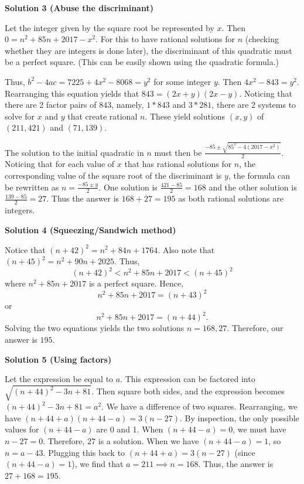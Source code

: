 \begin{enumerate}
\textbf{Solution 3 (Abuse the discriminant)}

Let the integer given by the square root be represented by $x$. Then $0 = n^2 + 85n + 2017 - x^2$. For this to have rational solutions for $n$ (checking whether they are integers is done later), the discriminant of this quadratic must be a perfect square. (This can be easily shown using the quadratic formula.)

 Thus, $b^2 - 4ac = 7225 + 4x^2 - 8068 = y^2$ for some integer $y$. Then $4x^2 - 843 = y^2$. Rearranging this equation yields that $843 = (2x+y)(2x-y)$. Noticing that there are 2 factor pairs of $843$, namely, $1*843$ and $3*281$, there are 2 systems to solve for $x$ and $y$ that create rational $n$. These yield solutions $(x,y)$ of $(211, 421)$ and $(71, 139)$.

 The solution to the initial quadratic in $n$ must then be $\frac{-85 \pm \sqrt{85^2 - 4(2017 - x^2)}}{2}$. Noticing that for each value of $x$ that has rational solutions for $n$, the corresponding value of the square root of the discriminant is $y$, the formula can be rewritten as $n = \frac{-85 \pm y}{2}$. One solution is $\frac{421 - 85}{2} = 168$ and the other solution is $\frac{139 - 85}{2} = 27$. Thus the answer is $168 + 27 = \boxed{195}$ as both rational solutions are integers.

 



\textbf{Solution 4 (Squeezing/Sandwich method)}

Notice that $(n+42)^2= n^2+84n+1764$. Also note that $(n+45)^2= n^2+90n+2025$. Thus, 
 \[(n+42)^2< n^2+85n+2017<(n+45)^2\] where $n^2+85n+2017$ is a perfect square. Hence,
 \[n^2+85n+2017= (n+43)^2\] or 
 \[n^2+85n+2017= (n+44)^2.\] Solving the two equations yields the two solutions $n= 168, 27$. Therefore, our answer is $\boxed{195}$.

 



\textbf{Solution 5 (Using factors)}

Let the expression be equal to $a$. This expression can be factored into $\sqrt{(n+44)^2-3n+81}$. Then square both sides, and the expression becomes $(n+44)^2-3n+81=a^2$. We have a difference of two squares. Rearranging, we have $(n+44+a)(n+44-a)=3(n-27)$. By inspection, the only possible values for $(n+44-a)$ are 0 and 1. When $(n+44-a)=0$, we must have $n-27=0$. Therefore, $27$ is a solution. When we have $(n+44-a)=1$, so $n=a-43$. Plugging this back to $(n+44+a)=3(n-27)$ (since $(n+44-a)=1$), we find that $a=211 \implies n=168$. Thus, the answer is $27+168= \boxed{195}$.


\end{enumerate}
